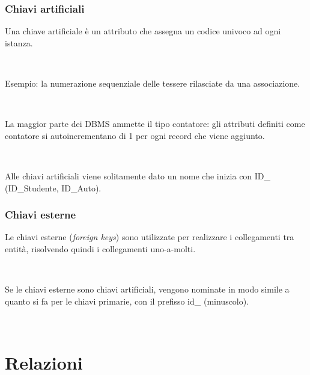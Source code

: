 \documentclass[]{beamer}
\begin{document}
\begin{frame}
\frametitle{Chiavi artificiali}
Una chiave artificiale è un attributo che assegna un \alert<1>{codice univoco} ad ogni istanza.\pause

~

Esempio: la numerazione sequenziale delle tessere rilasciate da una associazione.\pause

~

La maggior parte dei DBMS ammette il tipo contatore: gli attributi definiti come contatore si \alert<3>{autoincrementano di 1 per ogni record che viene aggiunto}.\pause

~

Alle chiavi artificiali viene solitamente dato un nome che inizia con \alert<4>{ID\_} (ID\_Studente, ID\_Auto).
\end{frame}


\begin{frame}
\frametitle{Chiavi esterne}
Le chiavi esterne (\emph{foreign keys}) sono utilizzate per \alert<1>{realizzare i collegamenti} tra entità, risolvendo quindi i collegamenti uno-a-molti.\pause

~

Se le chiavi esterne sono chiavi artificiali, vengono nominate in modo simile a quanto si fa per le chiavi primarie, con il prefisso \alert<2>{id\_} (minuscolo).\pause

~

\end{frame}


\section{Relazioni}
\end{document}
